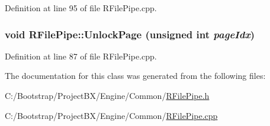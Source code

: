 Definition at line 95 of file RFilePipe.cpp.\hypertarget{class_r_file_pipe_a4d2d656640a49f4638891d1db01556d}{
\subsubsection[{UnlockPage}]{\setlength{\rightskip}{0pt plus 5cm}void RFilePipe::UnlockPage (unsigned int {\em pageIdx})}}
\label{class_r_file_pipe_a4d2d656640a49f4638891d1db01556d}




Definition at line 87 of file RFilePipe.cpp.

The documentation for this class was generated from the following files:\begin{CompactItemize}
\item 
C:/Bootstrap/ProjectBX/Engine/Common/\hyperlink{_r_file_pipe_8h}{RFilePipe.h}\item 
C:/Bootstrap/ProjectBX/Engine/Common/\hyperlink{_r_file_pipe_8cpp}{RFilePipe.cpp}\end{CompactItemize}
